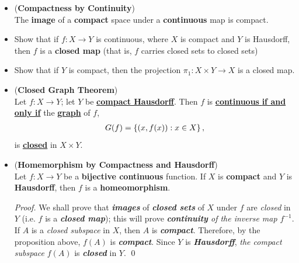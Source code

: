 \documentclass[11pt]{article}
\begin{document}
\begin{itemize}
\item \begin{proposition} (\textbf{Compactness by Continuity}) \citep{munkres2000topology} \\
The \textbf{image} of a \textbf{compact} space under a \textbf{continuous} map is compact.
\end{proposition}

\item \begin{exercise}
Show that if $f : X \rightarrow Y$ is continuous, where $X$ is compact and $Y$ is Hausdorff, then $f$ is a \textbf{closed map} (that is, $f$ carries closed sets to closed sets)
\end{exercise}

\item \begin{exercise}
Show that if $Y$ is compact, then the projection $\pi_1 : X \times Y \rightarrow X$ is a closed map.
\end{exercise}

\item \begin{theorem} (\textbf{Closed Graph Theorem}) \citep{reed1980methods, munkres2000topology}\\
Let $f : X \rightarrow Y$; let $Y$ be \underline{\textbf{compact Hausdorff}}. Then $f$ is \underline{\textbf{continuous} \textbf{if and only if}} the \underline{\textbf{graph}} of $f$,
\begin{align*}
G(f) = \left\{(x, f(x)):  x\in X\right\},
\end{align*}
is \underline{\textbf{closed}} in $X \times Y$. 
\end{theorem} 

\item \begin{theorem} (\textbf{Homemorphism by Compactness and Hausdorff})\citep{munkres2000topology}\\
Let $f : X \rightarrow Y$ be a \textbf{bijective continuous} function. If $X$ is \textbf{compact} and $Y$ is \textbf{Hausdorff}, then $f$ is a \textbf{homeomorphism}.
\end{theorem}
\begin{proof}
We shall prove that \emph{\textbf{images}} of \emph{\textbf{closed sets}} of $X$ under $f$ are \emph{closed} in $Y$ (i.e. $f$ is a \emph{\textbf{closed map}}); this
will prove \emph{\textbf{continuity} of the inverse map $f^{-1}$}. If $A$ is a \emph{closed subspace} in $X$, then $A$ is \emph{\textbf{compact}}. Therefore, by the proposition above, $f(A)$ is \emph{\textbf{compact}}. Since $Y$ is \emph{\textbf{Hausdorff}}, \emph{the compact subspace} $f(A)$ is \emph{\textbf{closed}} in $Y$. \qed
\end{proof}


\end{itemize}
\end{document}
